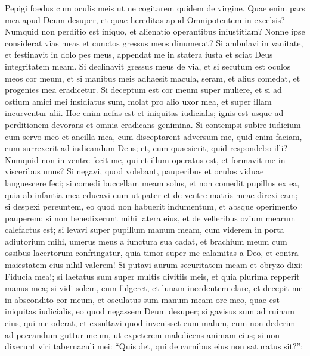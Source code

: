\begin{biblechapter}  
\verse Pepigi foedus cum oculis meis ut ne cogitarem quidem de virgine. 
\verse Quae enim pars mea apud Deum desuper, et quae hereditas apud Omnipotentem in excelsis? 
\verse Numquid non perditio est iniquo, et alienatio operantibus iniustitiam? 
\verse Nonne ipse considerat vias meas et cunctos gressus meos dinumerat? 
\verse Si ambulavi in vanitate, et festinavit in dolo pes meus, 
\verse appendat me in statera iusta et sciat Deus integritatem meam. 
\verse Si declinavit gressus meus de via, et si secutum est oculos meos cor meum, et si manibus meis adhaesit macula, 
\verse seram, et alius comedat, et progenies mea eradicetur. 
\verse Si deceptum est cor meum super muliere, et si ad ostium amici mei insidiatus sum, 
\verse molat pro alio uxor mea, et super illam incurventur alii. 
\verse Hoc enim nefas est et iniquitas iudicialis; 
\verse ignis est usque ad perditionem devorans et omnia eradicans genimina. 
\verse Si contempsi subire iudicium cum servo meo et ancilla mea, cum disceptarent adversum me, 
\verse quid enim faciam, cum surrexerit ad iudicandum Deus; et, cum quaesierit, quid respondebo illi? 
\verse Numquid non in ventre fecit me, qui et illum operatus est, et formavit me in visceribus unus? 
\verse Si negavi, quod volebant, pauperibus et oculos viduae languescere feci; 
\verse si comedi buccellam meam solus, et non comedit pupillus ex ea, 
\verse quia ab infantia mea educavi eum ut pater et de ventre matris meae direxi eam; 
\verse si despexi pereuntem, eo quod non habuerit indumentum, et absque operimento pauperem; 
\verse si non benedixerunt mihi latera eius, et de velleribus ovium mearum calefactus est; 
\verse si levavi super pupillum manum meam, cum viderem in porta adiutorium mihi, 
\verse umerus meus a iunctura sua cadat, et brachium meum cum ossibus lacertorum confringatur, 
\verse quia timor super me calamitas a Deo, et contra maiestatem eius nihil valerem! 
\verse Si putavi aurum securitatem meam et obryzo dixi: Fiducia mea!; 
\verse si laetatus sum super multis divitiis meis, et quia plurima repperit manus mea; 
\verse si vidi solem, cum fulgeret, et lunam incedentem clare, 
\verse et decepit me in abscondito cor meum, et osculatus sum manum meam ore meo, 
\verse quae est iniquitas iudicialis, eo quod negassem Deum desuper; 
\verse si gavisus sum ad ruinam eius, qui me oderat, et exsultavi quod invenisset eum malum, 
\verse cum non dederim ad peccandum guttur meum, ut expeterem maledicens animam eius; 
\verse si non dixerunt viri tabernaculi mei: “Quis det, qui de carnibus eius non saturatus sit?”; 

\end{biblechapter}
